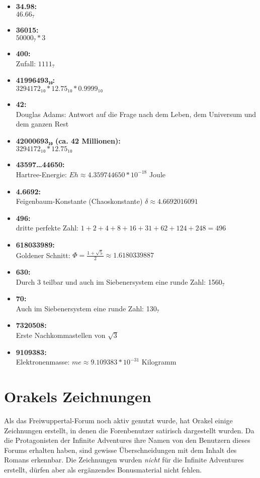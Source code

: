 \begin{itemize}
    \item \textbf{34.98:}\\ $46.66₇$
    \item \textbf{36015:}\\ $50000₇ * 3$
    \item \textbf{400:}\\ Zufall: $1111₇$
    \item \textbf{41996493₁₀:}\\ $3294172₁₀*12.75₁₀*0.9999₁₀$
    \item \textbf{42:}\\ Douglas Adams: Antwort auf die Frage nach dem Leben, dem Universum und dem ganzen Rest
    \item \textbf{42000693₁₀ (ca. 42 Millionen):}\\ $3294172₁₀*12.75₁₀$
    \item \textbf{43597…44650:}\\ Hartree-Energie: $Eh ≈ 4.359744650*10^{-18}$ Joule
    \item \textbf{4.6692:}\\ Feigenbaum-Konstante (Chaoskonstante) $δ ≈ 4.6692016091$
    \item \textbf{496:}\\ dritte perfekte Zahl: $1+2+4+8+16+31+62+124+248 = 496$
    \item \textbf{618033989:}\\ Goldener Schnitt: $Φ = \frac{1+\sqrt{5}}{2} ≈ 1.6180339887$
    \item \textbf{630:}\\ Durch 3 teilbar und auch im Siebenersystem eine runde Zahl: 1560₇
    \item \textbf{70:}\\ Auch im Siebenersystem eine runde Zahl: 130₇
    \item \textbf{7320508:}\\ Erste Nachkommastellen von $\sqrt{3}$
    \item \textbf{9109383:}\\ Elektronenmasse: $me ≈ 9.109383*10^{-31}$ Kilogramm
\end{itemize}


\chapter{Orakels Zeichnungen}

Als das Freiwuppertal-Forum noch aktiv genutzt wurde, hat Orakel einige Zeichnungen erstellt, in denen die Forenbenutzer satirisch dargestellt wurden. Da die Protagonisten der Infinite Adventures ihre Namen von den Benutzern dieses Forums erhalten haben, sind gewisse Überschneidungen mit dem Inhalt des Romans erkennbar. Die Zeichnungen wurden \emph{nicht} für die Infinite Adventures erstellt, dürfen aber als ergänzendes Bonusmaterial nicht fehlen.

